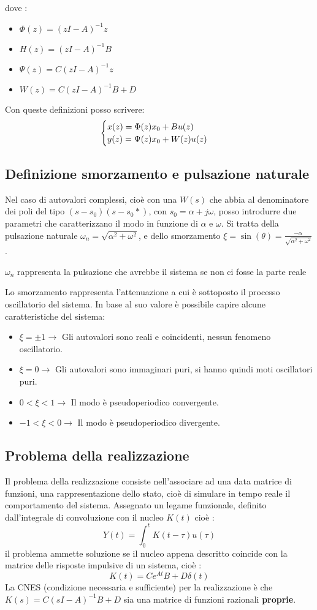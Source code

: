 \documentclass{article}
\begin{document}
dove :
\begin{itemize}
    \item $\Phi(z)=(zI-A)^{-1}z$
    \item $H(z)=(zI-A)^{-1}B$
    \item $\Psi(z)=C(zI-A)^{-1}z$
    \item $W(z)=C(zI-A)^{-1}B+D$
\end{itemize}
Con queste definizioni posso scrivere:
\[
\begin{cases}
    x(z)=\Phi(z)x_0+Bu(z)\\
    y(z)=\Psi(z)x_0+W(z)u(z)
\end{cases}\\
\]


\subsection{Definizione smorzamento e pulsazione naturale}
Nel caso di autovalori complessi, cioè con una $W(s)$ che abbia  al denominatore 
dei poli del tipo $(s-s_0)(s-s_0*)$, con $s_0 = \alpha+j\omega$,
posso introdurre due parametri che caratterizzano il modo in funzione di $\alpha$ e $\omega$.
Si tratta della pulsazione naturale $\omega _n = \sqrt{\alpha^2 + \omega^2}$,
e dello smorzamento $\xi = \sin(\theta) = \frac{-\alpha}{\sqrt{\alpha^2 + \omega^2}} $.

$\omega_n$ rappresenta la pulsazione che avrebbe il sistema se non ci fosse la parte reale

Lo smorzamento rappresenta l'attenuazione a cui è sottoposto il processo oscillatorio del sistema.
In base al suo valore è possibile capire alcune caratteristiche del sistema:
\begin{itemize}
    \item $\xi = \pm 1 \to $ Gli autovalori sono reali e coincidenti, nessun fenomeno oscillatorio.
    \item $\xi = 0 \to$ Gli autovalori sono immaginari puri, si hanno quindi moti oscillatori puri.
    \item $0<\xi<1 \to$ Il modo è pseudoperiodico convergente.
    \item $-1<\xi<0 \to$ Il modo è  pseudoperiodico divergente.
\end{itemize}


\subsection{Problema della realizzazione}
Il problema della realizzazione consiste nell'associare ad una data matrice di funzioni,
una rappresentazione dello stato, cioè di simulare in tempo reale il comportamento del sistema.
Assegnato un legame funzionale, definito dall'integrale di convoluzione con il nucleo $K(t)$ cioè :
\[ Y(t)=\int_{0}^{t}K(t-\tau)u(\tau) \]
il problema ammette soluzione se il nucleo appena descritto coincide con la matrice delle risposte impulsive di un sistema, cioè :
\[ K(t)=Ce^{At}B+D\delta(t) \]
La CNES (condizione necessaria e sufficiente) per la realizzazione è che $K(s)=C(sI-A)^{-1}B+D$ sia una matrice di funzioni razionali \textbf{proprie}.
\end{document}
